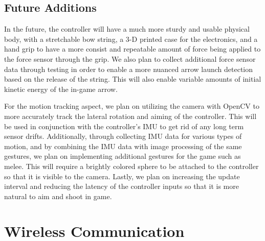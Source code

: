\documentclass[titlepage, 12pt]{scrartcl}
\begin{document}
    \subsection{Future Additions}
    	In the future, the controller will have a much more sturdy and usable physical body, with a stretchable bow string, a 3-D printed case for the electronics, and a hand grip to have a more consist and repeatable amount of force being applied to the force sensor through the grip. We also plan to collect additional force sensor data through testing in order to enable a more nuanced arrow launch detection based on the release of the string. This will also enable variable amounts of initial kinetic energy of the in-game arrow. \par
    	For the motion tracking aspect, we plan on utilizing the camera with OpenCV to more accurately track the lateral rotation and aiming of the controller. This will be used in conjunction with the controller's IMU to get rid of any long term sensor drifts. Additionally, through collecting IMU data for various types of motion, and by combining the IMU data with image processing of the same gestures, we plan on implementing additional gestures for the game such as melee. This will require a brightly colored sphere to be attached to the controller so that it is visible to the camera. Lastly, we plan on increasing the update interval and reducing the latency of the controller inputs so that it is more natural to aim and shoot in game. \par
\section{Wireless Communication}
\end{document}
